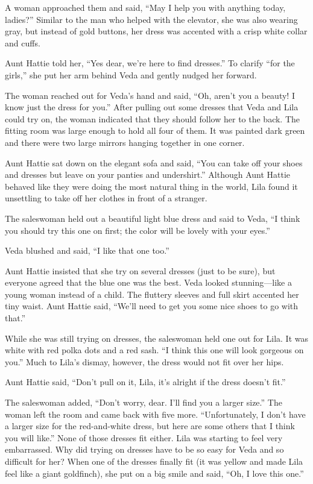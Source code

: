 \documentclass[
  letterpaper,
]{book}
\begin{document}
A woman approached them and said, ``May I help you with anything today,
ladies?'' Similar to the man who helped with the elevator, she was also
wearing gray, but instead of gold buttons, her dress was accented with a
crisp white collar and cuffs.

Aunt Hattie told her, ``Yes dear, we're here to find dresses.'' To
clarify ``for the girls,'' she put her arm behind Veda and gently nudged
her forward.

The woman reached out for Veda's hand and said, ``Oh, aren't you a
beauty! I know just the dress for you.'' After pulling out some dresses
that Veda and Lila could try on, the woman indicated that they should
follow her to the back. The fitting room was large enough to hold all
four of them. It was painted dark green and there were two large mirrors
hanging together in one corner.

Aunt Hattie sat down on the elegant sofa and said, ``You can take off
your shoes and dresses but leave on your panties and undershirt.''
Although Aunt Hattie behaved like they were doing the most natural thing
in the world, Lila found it unsettling to take off her clothes in front
of a stranger.

The saleswoman held out a beautiful light blue dress and said to Veda,
``I think you should try this one on first; the color will be lovely
with your eyes.''

Veda blushed and said, ``I like that one too.''

Aunt Hattie insisted that she try on several dresses (just to be sure),
but everyone agreed that the blue one was the best. Veda looked
stunning---like a young woman instead of a child. The fluttery sleeves
and full skirt accented her tiny waist. Aunt Hattie said, ``We'll need
to get you some nice shoes to go with that.''

While she was still trying on dresses, the saleswoman held one out for
Lila. It was white with red polka dots and a red sash. ``I think this
one will look gorgeous on you.'' Much to Lila's dismay, however, the
dress would not fit over her hips.

Aunt Hattie said, ``Don't pull on it, Lila, it's alright if the dress
doesn't fit.''

The saleswoman added, ``Don't worry, dear. I'll find you a larger
size.'' The woman left the room and came back with five more.
``Unfortunately, I don't have a larger size for the red-and-white dress,
but here are some others that I think you will like.'' None of those
dresses fit either. Lila was starting to feel very embarrassed. Why did
trying on dresses have to be so easy for Veda and so difficult for her?
When one of the dresses finally fit (it was yellow and made Lila feel
like a giant goldfinch), she put on a big smile and said, ``Oh, I love
this one.''
\end{document}
